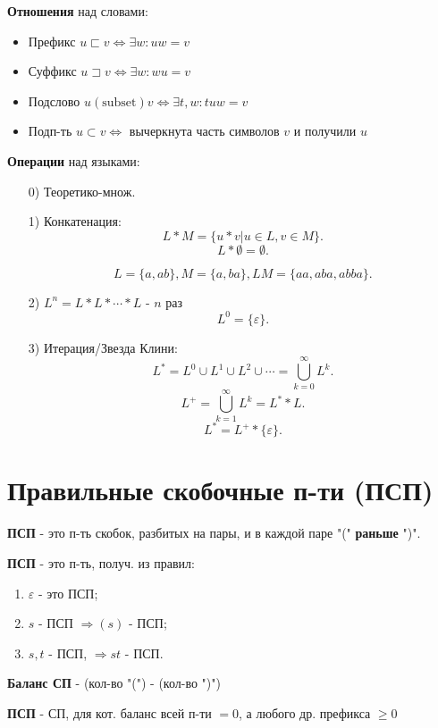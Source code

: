 \textbf{Отношения} над словами:
\begin{itemize}
    \item Префикс $u \sqsubset v \iff \exists w \colon uw = v$ 
    \item Суффикс $u \sqsupset v \iff \exists w \colon wu = v$
    \item Подслово $u (\text{subset}) v \iff \exists t, w \colon tuw = v$
    \item Подп-ть $u \subset v \iff$ вычеркнута часть символов $v$ и получили $u$
\end{itemize}

\textbf{Операции} над языками:
\begin{enumerate}
    \item [0) ] Теоретико-множ.
    \item [1) ] Конкатенация:
        \[
        L * M = \{u * v | u \in L, v \in M\}
        .\] 
        \[
        L * \emptyset = \emptyset
        .\] 
        \begin{example}
        \[
        L = \{a, ab\}, M = \{a, ba\}, LM = \{aa, aba, abba\}
        .\] 
        \end{example}

    \item [2) ] $L^{n} = L * L * \cdots * L$ - $n$ раз
        \[
        L^{0} = \{\varepsilon\} 
        .\] 
    \item [3) ] Итерация/Звезда Клини:
        \[
        L^{*} = L^{0} \cup L^{1} \cup L^{2} \cup \cdots = \bigcup_{k = 0}^{\infty} L^{k} 
        .\] 
        \[
        L^{+} = \bigcup_{k = 1}^{\infty} L^{k} = L^{*} * L
        .\] 
        \[
        L^{*} = L^{+} * \{\varepsilon\} 
        .\] 
        
\end{enumerate}

\section{Правильные скобочные п-ти (ПСП)}

\begin{definition}
    \textbf{ПСП} - это п-ть скобок, разбитых на пары, и в каждой паре "(" \textbf{раньше} ")".
\end{definition}
\begin{definition}
    \textbf{ПСП} - это п-ть, получ. из правил:
    \begin{enumerate}
        \item $\varepsilon$ - это ПСП;
        \item $s$ - ПСП $\Rightarrow (s)$ - ПСП;
        \item $s, t$ -  ПСП, $\Rightarrow st$ - ПСП.
    \end{enumerate}
\end{definition}
\begin{definition}
\textbf{Баланс СП} - (кол-во "(") - (кол-во ")")
\end{definition}
\begin{definition}
    \textbf{ПСП} - СП, для кот. баланс всей п-ти $ = 0$, а любого др. префикса $ \geq 0$
\end{definition}


